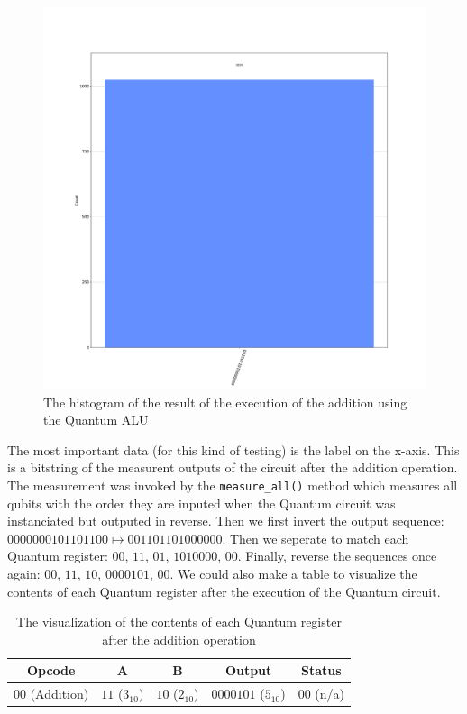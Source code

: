 \begin{figure}[ht]
    \centering
    \includegraphics[scale=0.2]{images/6_Complete_System/qalu_aer_result_addition.pdf}
    \caption{The histogram of the result of the execution of the addition using the Quantum ALU}
\end{figure}

The most important data (for this kind of testing) is the label on the x-axis. This is a bitstring of the measurent outputs of the circuit after the 
addition operation. The measurement was invoked by the \verb|measure_all()| method which measures all qubits with the order
they are inputed when the Quantum circuit was instanciated but outputed in reverse. Then we first invert the output sequence:
$0000000101101100\mapsto001101101000000$. Then we seperate to match each Quantum register: $00$, $11$, $01$, $1010000$, $00$.
Finally, reverse the sequences once again: $00$, $11$, $10$, $0000101$, $00$. We could also make a table to visualize the contents
of each Quantum register after the execution of the Quantum circuit.

\begin{table}[ht]
    \centering
    \begin{tabular}{c|c|c|c|c}
        Opcode & A & B & Output & Status \\
        \hline
        $00$ (Addition) & $11$ ($3_{10}$) & $10$ ($2_{10}$) & $0000101$ ($5_{10}$) & $00$ (n/a)\\
    \end{tabular}
    \caption{The visualization of the contents of each Quantum register after the addition operation}
\end{table}

